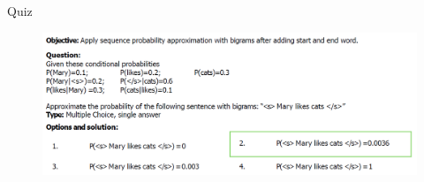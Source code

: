 \begin{frame}{Quiz}
    \begin{figure}
        \centering
        \includegraphics[height=0.8\textheight,width=1\textwidth,keepaspectratio]{images/nlp-intro/quiz-sos-eos.png}
    \end{figure}
\end{frame}

